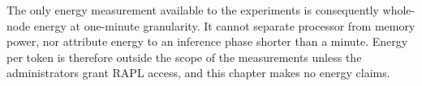 The only energy measurement available to the experiments is consequently
whole-node energy at one-minute granularity.  It cannot separate
processor from memory power, nor attribute energy to an inference phase
shorter than a minute.  Energy per token is therefore outside the scope
of the measurements unless the administrators grant RAPL access, and
this chapter makes no energy claims.
